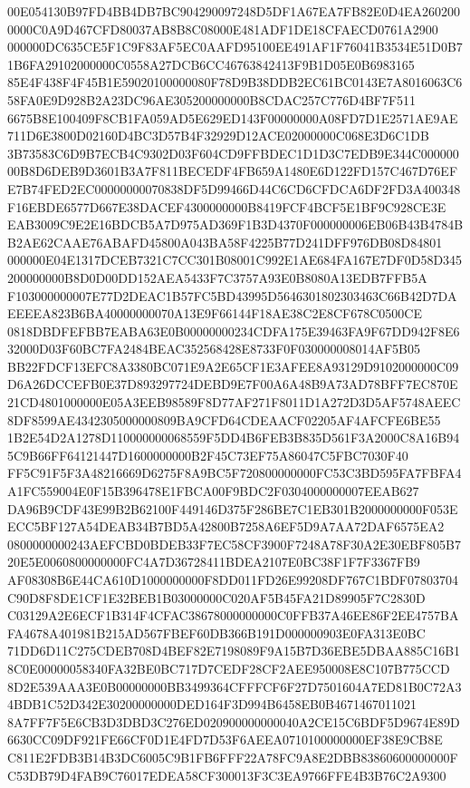 \documentclass[UTF8,fontset=fandol,zihao=-4,a4paper]{ctexart}
\begin{document}
{{00E054130B97FD4BB4DB7BC904290097248D5DF1A67EA7FB82E0D4EA2602000000C0A9D467CFD80037AB8B8C08000E481ADF1DE18CFAECD0761A2900
000000DC635CE5F1C9F83AF5EC0AAFD95100EE491AF1F76041B3534E51D0B71B6FA29102000000C0558A27DCB6CC46763842413F9B1D05E0B6983165
85E4F438F4F45B1E59020100000080F78D9B38DDB2EC61BC0143E7A8016063C658FA0E9D928B2A23DC96AE305200000000B8CDAC257C776D4BF7F511
6675B8E100409F8CB1FA059AD5E629ED143F00000000A08FD7D1E2571AE9AE711D6E3800D02160D4BC3D57B4F32929D12ACE02000000C068E3D6C1DB
3B73583C6D9B7ECB4C9302D03F604CD9FFBDEC1D1D3C7EDB9E344C00000000B8D6DEB9D3601B3A7F811BECEDF4FB659A1480E6D122FD157C467D76EF
E7B74FED2EC00000000070838DF5D99466D44C6CD6CFDCA6DF2FD3A400348F16EBDE6577D667E38DACEF4300000000B8419FCF4BCF5E1BF9C928CE3E
EAB3009C9E2E16BDCB5A7D975AD369F1B3D4370F000000006EB06B43B4784BB2AE62CAAE76ABAFD45800A043BA58F4225B77D241DFF976DB08D84801
000000E04E1317DCEB7321C7CC301B08001C992E1AE684FA167E7DF0D58D345200000000B8D0D00DD152AEA5433F7C3757A93E0B8080A13EDB7FFB5A
F103000000007E77D2DEAC1B57FC5BD43995D5646301802303463C66B42D7DAEEEEA823B6BA40000000070A13E9F66144F18AE38C2E8CF678C0500CE
0818DBDFEFBB7EABA63E0B00000000234CDFA175E39463FA9F67DD942F8E632000D03F60BC7FA2484BEAC352568428E8733F0F030000008014AF5B05
BB22FDCF13EFC8A3380BC071E9A2E65CF1E3AFEE8A93129D9102000000C09D6A26DCCEFB0E37D893297724DEBD9E7F00A6A48B9A73AD78BFF7EC870E
21CD4801000000E05A3EEB98589F8D77AF271F8011D1A272D3D5AF5748AEEC8DF8599AE4342305000000809BA9CFD64CDEAACF02205AF4AFCFE6BE55
1B2E54D2A1278D110000000068559F5DD4B6FEB3B835D561F3A2000C8A16B945C9B66FF64121447D1600000000B2F45C73EF75A86047C5FBC7030F40
FF5C91F5F3A48216669D6275F8A9BC5F720800000000FC53C3BD595FA7FBFA4A1FC559004E0F15B396478E1FBCA00F9BDC2F0304000000007EEAB627
DA96B9CDF43E99B2B62100F449146D375F286BE7C1EB301B2000000000F053EECC5BF127A54DEAB34B7BD5A42800B7258A6EF5D9A7AA72DAF6575EA2
0800000000243AEFCBD0BDEB33F7EC58CF3900F7248A78F30A2E30EBF805B720E5E0060800000000FC4A7D36728411BDEA2107E0BC38F1F7F3367FB9
AF08308B6E44CA610D1000000000F8DD011FD26E99208DF767C1BDF07803704C90D8F8DE1CF1E32BEB1B03000000C020AF5B45FA21D89905F7C2830D
C03129A2E6ECF1B314F4CFAC38678000000000C0FFB37A46EE86F2EE4757BAFA4678A401981B215AD567FBEF60DB366B191D000000903E0FA313E0BC
71DD6D11C275CDEB708D4BEF82E7198089F9A15B7D36EBE5DBAA885C16B18C0E00000058340FA32BE0BC717D7CEDF28CF2AEE950008E8C107B775CCD
8D2E539AAA3E0B00000000BB3499364CFFFCF6F27D7501604A7ED81B0C72A34BDB1C52D342E30200000000DED164F3D994B6458EB0B4671467011021
8A7FF7F5E6CB3D3DBD3C276ED020900000000040A2CE15C6BDF5D9674E89D6630CC09DF921FE66CF0D1E4FD7D53F6AEEA0710100000000EF38E9CB8E
C811E2FDB3B14B3DC6005C9B1FB6FFF22A78FC9A8E2DBB83860600000000FC53DB79D4FAB9C76017EDEA58CF300013F3C3EA9766FFE4B3B76C2A9300
}}
\end{document}
